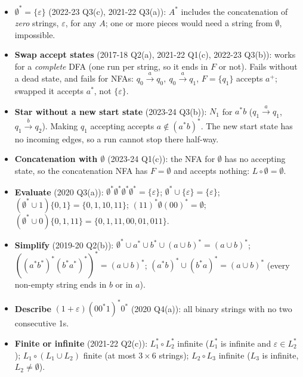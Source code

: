 \documentclass[10.5pt,a4paper]{article}
\newcommand{\eps}{\varepsilon}
\begin{document}
\begin{recipe}
\begin{itemize}
\item \textbf{$\emptyset^*=\{\eps\}$} (2022-23 Q3(c), 2021-22 Q3(a)): $A^*$ includes the concatenation of \emph{zero} strings, $\eps$, for any
$A$; one or more pieces would need a string from $\emptyset$, impossible.
\item \textbf{Swap accept states} (2017-18 Q2(a), 2021-22 Q1(c), 2022-23 Q3(b)): works for a \emph{complete} DFA (one run per string, so it
ends in $F$ or not). Fails without a dead state, and fails for NFAs: $q_0\xrightarrow{a}q_0,\ q_0\xrightarrow{a}q_1$, $F=\{q_1\}$ accepts $a^+$;
swapped it accepts $a^*$, not $\{\eps\}$.
\item \textbf{Star without a new start state} (2023-24 Q3(b)): $N_1$ for $a^*b$ ($q_1\xrightarrow{a}q_1$, $q_1\xrightarrow{b}q_2$). Making $q_1$
accepting accepts $a\notin(a^*b)^*$. The new start state has no incoming edges, so a run cannot stop there half-way.
\item \textbf{Concatenation with $\emptyset$} (2023-24 Q1(c)): the NFA for $\emptyset$ has no accepting state, so the concatenation NFA has
$F=\emptyset$ and accepts nothing: $L\circ\emptyset=\emptyset$.
\item \textbf{Evaluate} (2020 Q3(a)): $\emptyset^*\emptyset^*\emptyset^*\emptyset^*=\{\eps\}$; $\emptyset^*\cup\{\eps\}=\{\eps\}$;
$(\emptyset^*\cup1)\{0,1\}=\{0,1,10,11\}$; $(11)^*\emptyset(00)^*=\emptyset$; $(\emptyset^*\cup0)\{0,1,11\}=\{0,1,11,00,01,011\}$.
\item \textbf{Simplify} (2019-20 Q2(b)): $\emptyset^*\cup a^*\cup b^*\cup(a\cup b)^*=(a\cup b)^*$; $((a^*b^*)^*(b^*a^*)^*)^*=(a\cup b)^*$;
$(a^*b)^*\cup(b^*a)^*=(a\cup b)^*$ (every non-empty string ends in $b$ or in $a$).
\item \textbf{Describe} $(1+\eps)(00^*1)^*0^*$ (2020 Q4(a)): all binary strings with no two consecutive 1s.
\item \textbf{Finite or infinite} (2021-22 Q2(c)): $L_1^*\circ L_2^*$ infinite ($L_1^*$ is infinite and $\eps\in L_2^*$);
$L_1\circ(L_1\cup L_2)$ finite (at most $3\times6$ strings); $L_2\circ L_3$ infinite ($L_3$ is infinite, $L_2\ne\emptyset$).
\end{itemize}
\end{recipe}

\end{document}
